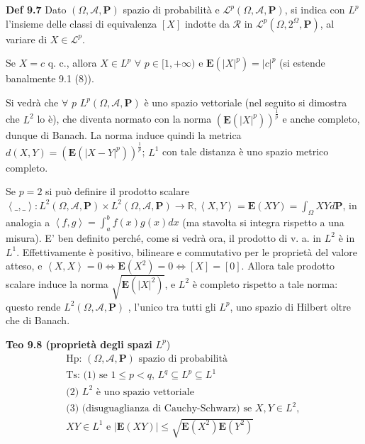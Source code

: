 \documentclass{article}
\begin{document}
\textbf{Def 9.7} Dato $\left( \Omega ,\mathcal{A},\mathbf{P}\right) $ spazio
di probabilit\`{a} e $\mathcal{L}^{p}\left( \Omega ,\mathcal{A},\mathbf{P}%
\right) $, si indica con $L^{p}$ l'insieme delle classi di equivalenza $%
\left[ X\right] $ indotte da $\mathcal{R}$ in $\mathcal{L}^{p}\left( \Omega
,2^{\Omega },\mathbf{P}\right) $, al variare di $X\in \mathcal{L}^{p}$.

Se $X=c$ q. c., allora $X\in L^{p}$ $\forall $ $p\in \lbrack 1,+\infty )$ e $%
\mathbf{E}\left( \left\vert X\right\vert ^{p}\right) =\left\vert
c\right\vert ^{p}$ (si estende banalmente 9.1 (8)).

Si vedr\`{a} che $\forall $ $p$ $L^{p}\left( \Omega ,\mathcal{A},\mathbf{P}%
\right) $ \`{e} uno spazio vettoriale (nel seguito si dimostra che $L^{2}$
lo \`{e}), che diventa normato con la norma $\left( \mathbf{E}\left(
\left\vert X\right\vert ^{p}\right) \right) ^{\frac{1}{p}}$ e anche
completo, dunque di Banach. La norma induce quindi la metrica $d\left(
X,Y\right) =\left( \mathbf{E}\left( \left\vert X-Y\right\vert ^{p}\right)
\right) ^{\frac{1}{p}}$; $L^{1}$ con tale distanza \`{e} uno spazio metrico
completo.

Se $p=2$ si pu\`{o} definire il prodotto scalare $\left\langle
\_,\_\right\rangle :L^{2}\left( \Omega ,\mathcal{A},\mathbf{P}\right) \times
L^{2}\left( \Omega ,\mathcal{A},\mathbf{P}\right) \rightarrow 
\mathbb{R}
,\left\langle X,Y\right\rangle =\mathbf{E}\left( XY\right) =\int_{\Omega }XYd%
\mathbf{P}$, in analogia a $\left\langle f,g\right\rangle
=\int_{a}^{b}f\left( x\right) g\left( x\right) dx$ (ma stavolta si integra
rispetto a una misura). E' ben definito perch\'{e}, come si vedr\`{a} ora,
il prodotto di v. a. in $L^{2}$ \`{e} in $L^{1}$. Effettivamente \`{e}
positivo, bilineare e commutativo per le propriet\`{a} del valore atteso, e $%
\left\langle X,X\right\rangle =0\Longleftrightarrow \mathbf{E}\left(
X^{2}\right) =0\Longleftrightarrow \left[ X\right] =\left[ 0\right] $.
Allora tale prodotto scalare induce la norma $\sqrt{\mathbf{E}\left(
\left\vert X\right\vert ^{2}\right) }$, e $L^{2}$ \`{e} completo rispetto a
tale norma: questo rende $L^{2}\left( \Omega ,\mathcal{A},\mathbf{P}\right) $%
, l'unico tra tutti gli $L^{p}$, uno spazio di Hilbert oltre che di Banach.

\textbf{Teo 9.8 (propriet\`{a} degli spazi }$L^{p}$)%
\begin{gather*}
\text{Hp: }\left( \Omega ,\mathcal{A},\mathbf{P}\right) \text{ spazio di
probabilit\`{a}} \\
\text{Ts: (1) se }1\leq p<q\text{, }L^{q}\subseteq L^{p}\subseteq L^{1} \\
\text{(2) }L^{2}\text{ \`{e} uno spazio vettoriale } \\
\text{(3) (disuguaglianza di Cauchy-Schwarz) se }X,Y\in L^{2}\text{, } \\
XY\in L^{1}\text{ e }\left\vert \mathbf{E}\left( XY\right) \right\vert \leq 
\sqrt{\mathbf{E}\left( X^{2}\right) \mathbf{E}\left( Y^{2}\right) }
\end{gather*}
\end{document}
